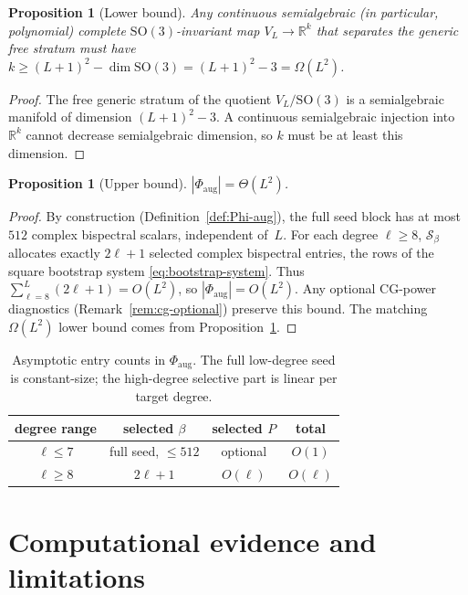 \documentclass[11pt]{article}
\theoremstyle{plain}
\newtheorem{proposition}[theorem]{Proposition}
\theoremstyle{definition}
\theoremstyle{remark}
\newcommand{\R}{\mathbb{R}}
\newcommand{\SO}{\mathrm{SO}}
\newcommand{\Sb}{\mathcal{S}_\beta}
\newcommand{\Phiaug}{\Phi_{\mathrm{aug}}}
\begin{document}
\begin{proposition}[Lower bound]\label{prop:lower-bound}
Any continuous semialgebraic (in particular, polynomial) complete
$\SO(3)$-invariant map $V_L\to\R^k$ that separates the generic free
stratum must have
$k\ge (L+1)^2-\dim\SO(3)=(L+1)^2-3=\Omega(L^2)$.
\end{proposition}
\begin{proof}
The free generic stratum of the quotient $V_L/\SO(3)$ is a
semialgebraic manifold of dimension $(L+1)^2-3$. A continuous
semialgebraic injection into $\R^k$ cannot decrease semialgebraic
dimension, so $k$ must be at least this dimension.
\end{proof}

\begin{proposition}[Upper bound]\label{prop:size}
$|\Phiaug| = \Theta(L^2)$.
\end{proposition}
\begin{proof}
By construction (Definition~\ref{def:Phi-aug}), the full seed block has
at most $512$ complex bispectral scalars, independent of~$L$. For each
degree $\ell\ge8$, $\Sb$ allocates exactly $2\ell+1$ selected complex
bispectral entries, the rows of the square bootstrap system
\eqref{eq:bootstrap-system}. Thus
$\sum_{\ell=8}^L(2\ell+1)=O(L^2)$, so $|\Phiaug|=O(L^2)$. Any optional
CG-power diagnostics (Remark~\ref{rem:cg-optional}) preserve this
bound. The matching $\Omega(L^2)$ lower bound comes from
Proposition~\ref{prop:lower-bound}.
\end{proof}

\begin{table}[h]
  \caption{Asymptotic entry counts in $\Phiaug$. The full low-degree
    seed is constant-size; the high-degree selective part is linear
    per target degree.}
  \label{tab:entry-counts}
  \centering
  \small
  \begin{tabular}{cccc}
    \toprule
    degree range & selected $\beta$ & selected $P$ & total \\
    \midrule
    $\ell\le7$ & full seed, $\le512$ & optional & $O(1)$ \\
    $\ell\ge8$ & $2\ell+1$ & $O(\ell)$ & $O(\ell)$ \\
    \bottomrule
  \end{tabular}
\end{table}

\section{Computational evidence and limitations}
\label{sec:certs}
\end{document}

